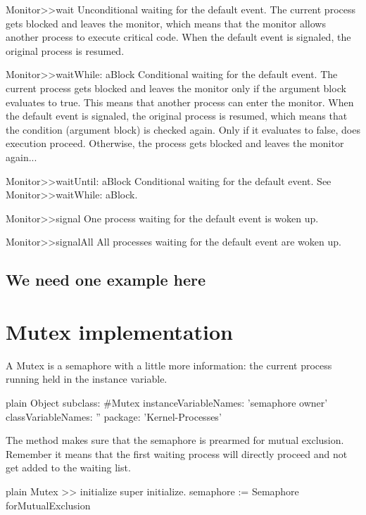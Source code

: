 \documentclass[10pt,twoside,english]{_support/latex/sbabook/sbabook}
\begin{document}
Monitor\textgreater{}\textgreater{}wait
Unconditional waiting for the default event.
The current process gets blocked and leaves the monitor, which means that the monitor allows another process to execute critical code. When the default event is signaled, the original process is resumed.

Monitor\textgreater{}\textgreater{}waitWhile: aBlock
Conditional waiting for the default event.
The current process gets blocked and leaves the monitor only if the argument block evaluates to true. This means that another process can enter the monitor. When the default event is signaled, the original process is resumed, which means that the condition (argument block) is checked again. Only if it evaluates to false, does execution proceed. Otherwise, the process gets blocked and leaves the monitor again...

Monitor\textgreater{}\textgreater{}waitUntil: aBlock
Conditional waiting for the default event.
See Monitor\textgreater{}\textgreater{}waitWhile: aBlock.

Monitor\textgreater{}\textgreater{}signal
One process waiting for the default event is woken up.

Monitor\textgreater{}\textgreater{}signalAll
All processes waiting for the default event are woken up.
\section{We need one example here}\chapter{Mutex implementation}
A Mutex is a semaphore with a little more information: the current process running held in the  instance variable. 

\begin{displaycode}{plain}
Object subclass: #Mutex
	instanceVariableNames: 'semaphore owner'
	classVariableNames: ''
	package: 'Kernel-Processes'
\end{displaycode}

The  method makes sure that the semaphore is prearmed for mutual exclusion.
Remember it means that the first waiting process will directly proceed and not get added to the waiting list.

\begin{displaycode}{plain}
Mutex >> initialize
	super initialize.
	semaphore := Semaphore forMutualExclusion
\end{displaycode}
\end{document}
